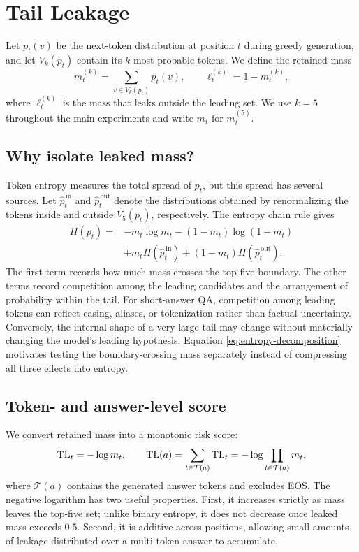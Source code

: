\section{Tail Leakage}
\label{sec:tail-leakage}

Let \(p_t(v)\) be the next-token distribution at position \(t\) during
greedy generation, and let \(V_k(p_t)\) contain its \(k\) most probable
tokens. We define the retained mass
\begin{equation}
    m_t^{(k)}=\sum_{v\in V_k(p_t)}p_t(v),
    \qquad
    \ell_t^{(k)}=1-m_t^{(k)},
    \label{eq:retained-mass}
\end{equation}
where \(\ell_t^{(k)}\) is the mass that leaks outside the leading set. We use
\(k=5\) throughout the main experiments and write \(m_t\) for
\(m_t^{(5)}\).

\subsection{Why isolate leaked mass?}

Token entropy measures the total spread of \(p_t\), but this spread has
several sources. Let \(\hat p_t^{\,\mathrm{in}}\) and
\(\hat p_t^{\,\mathrm{out}}\) denote the distributions obtained by
renormalizing the tokens inside and outside \(V_5(p_t)\), respectively. The
entropy chain rule gives
\begin{align}
H(p_t)={}&-m_t\log m_t-(1-m_t)\log(1-m_t) \nonumber\\
         &+m_t H(\hat p_t^{\,\mathrm{in}})
          +(1-m_t)H(\hat p_t^{\,\mathrm{out}}).
\label{eq:entropy-decomposition}
\end{align}
The first term records how much mass crosses the top-five boundary. The other
terms record competition among the leading candidates and the arrangement of
probability within the tail. For short-answer QA, competition among leading
tokens can reflect casing, aliases, or tokenization rather than factual
uncertainty. Conversely, the internal shape of a very large tail may change
without materially changing the model's leading hypothesis. Equation
\ref{eq:entropy-decomposition} motivates testing the boundary-crossing mass
separately instead of compressing all three effects into entropy.

\subsection{Token- and answer-level score}

We convert retained mass into a monotonic risk score:
\begin{equation}
    \mathrm{TL}_t=-\log m_t,
    \qquad
    \mathrm{TL}(a)=\sum_{t\in\mathcal{T}(a)}\mathrm{TL}_t
          =-\log\prod_{t\in\mathcal{T}(a)}m_t ,
\label{eq:tail-leakage}
\end{equation}
where \(\mathcal{T}(a)\) contains the generated answer tokens and excludes
EOS. The negative logarithm has two useful properties. First, it increases
strictly as mass leaves the top-five set; unlike binary entropy, it does not
decrease once leaked mass exceeds \(0.5\). Second, it is additive across
positions, allowing small amounts of leakage distributed over a multi-token
answer to accumulate.

